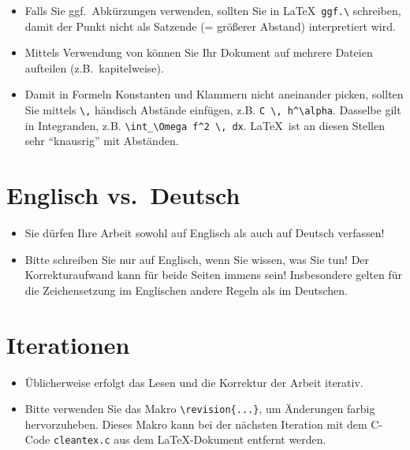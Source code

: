 \documentclass[a4paper,11pt,bibliography=totoc,listof=totoc,headinclude=true,cleardoublepage=empty,oneside]{scrbook}
\def\revision#1{{\color{red}#1}}
\begin{document}
{\begin{itemize}
\item Falls Sie ggf.\ Abkürzungen verwenden, sollten Sie in \LaTeX\ \verb$ggf.\$ schreiben, damit der Punkt nicht als Satzende (= größerer Abstand) interpretiert wird.

\item Mittels Verwendung von \verb$$ können Sie Ihr Dokument auf mehrere Dateien aufteilen (z.B.\ kapitelweise).

\item Damit in Formeln Konstanten und Klammern nicht aneinander picken, sollten Sie mittels \verb$\,$ händisch Abstände einfügen, z.B. \verb$C \, h^\alpha$. Dasselbe gilt in Integranden, z.B. \verb$\int_\Omega f^2 \, dx$. \LaTeX\ ist an diesen Stellen sehr "`knausrig"' mit Abständen.
\end{itemize}
}

\section{Englisch vs.\ Deutsch}

{\color{change}
\begin{itemize}

\item Sie dürfen Ihre Arbeit sowohl auf Englisch als auch auf Deutsch verfassen!

\item Bitte schreiben Sie nur auf Englisch, wenn Sie wissen, was Sie tun! Der Korrekturaufwand kann für beide Seiten immens sein! Insbesondere gelten für die Zeichensetzung im Englischen andere Regeln als im Deutschen.

\end{itemize}
}

\section{Iterationen}

{\color{change}
\begin{itemize}

\item Üblicherweise erfolgt das Lesen und die Korrektur der Arbeit iterativ.
\item Bitte verwenden Sie das Makro \verb$\revision{...}$, um Änderungen \revision{farbig hervorzuheben}. Dieses Makro kann bei der nächsten Iteration mit dem C-Code \verb$cleantex.c$ aus dem \LaTeX-Dokument entfernt werden.

\end{itemize}
}
\end{document}
